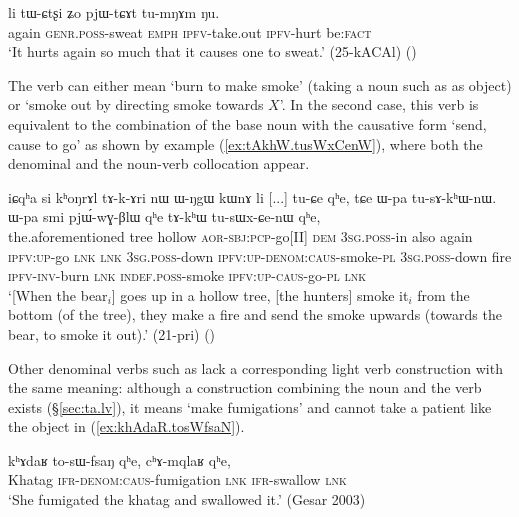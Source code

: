 \begin{exe}
\ex \label{ex:tWCtsxi.pjWtCAt}
 \gll  li tɯ-ɕtʂi ʑo pjɯ-tɕɤt tu-mŋɤm ŋu. \\
 again \textsc{genr}.\textsc{poss}-sweat \textsc{emph} \textsc{ipfv}-take.out \textsc{ipfv}-hurt be:\textsc{fact} \\
 \glt `It hurts again so much that it causes one to sweat.' (25-kACAl)
()
\end{exe}
 
The verb  can either mean `burn to make smoke' (taking a noun such as  as object) or `smoke out by directing smoke towards $X$'. In the second case, this verb is equivalent to the combination of the base noun  with the causative form  `send, cause to go' as shown by example (\ref{ex:tAkhW.tusWxCenW}), where both the denominal  and the noun-verb collocation appear.

\begin{exe}
\ex \label{ex:tAkhW.tusWxCenW}
 \gll  iɕqʰa si kʰoŋrɤl tɤ-k-ɤri nɯ ɯ-ŋgɯ kɯnɤ li [...] tu-ɕe qʰe, tɕe ɯ-pa tu-sɤ-kʰɯ-nɯ. ɯ-pa smi pjɯ́-wɣ-βlɯ qʰe tɤ-kʰɯ tu-sɯx-ɕe-nɯ qʰe, \\
 the.aforementioned tree hollow \textsc{aor}-\textsc{sbj}:\textsc{pcp}-go[II] \textsc{dem} \textsc{3sg}.\textsc{poss}-in also again {  } \textsc{ipfv}:\textsc{up}-go \textsc{lnk} \textsc{lnk} \textsc{3sg}.\textsc{poss}-down \textsc{ipfv}:\textsc{up}-\textsc{denom}:\textsc{caus}-smoke-\textsc{pl} \textsc{3sg}.\textsc{poss}-down fire \textsc{ipfv}-\textsc{inv}-burn \textsc{lnk} \textsc{indef}.\textsc{poss}-smoke \textsc{ipfv}:\textsc{up}-\textsc{caus}-go-\textsc{pl} \textsc{lnk}  \\
\glt `[When the bear$_i$] goes up in a hollow tree, [the hunters] smoke it$_i$ from the bottom (of the tree), they make a fire and send the smoke upwards (towards the bear, to smoke it out).' (21-pri)
()
\end{exe}

Other denominal verbs such as  lack a corresponding light verb construction with the same meaning: although a construction combining the noun   and the verb  exists (§\ref{sec:ta.lv}), it means `make fumigations' and cannot take a patient like the object  in (\ref{ex:khAdaR.tosWfsaN}).

\begin{exe}
\ex \label{ex:khAdaR.tosWfsaN}
 \gll kʰɤdaʁ to-sɯ-fsaŋ qʰe, cʰɤ-mqlaʁ qʰe, \\
 Khatag \textsc{ifr}-\textsc{denom}:\textsc{caus}-fumigation \textsc{lnk} \textsc{ifr}-swallow \textsc{lnk} \\
 \glt `She fumigated the khatag and swallowed it.' (Gesar 2003)
\end{exe}

